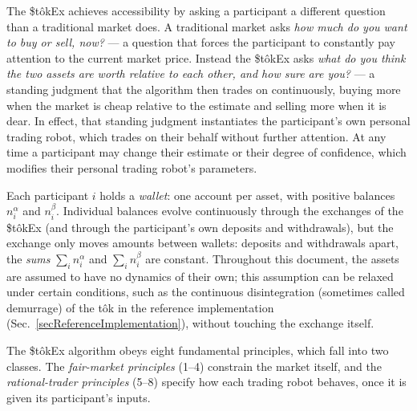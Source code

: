 \documentclass[letterpaper]{article}
\newcommand{\StokEx}{\$t\^{o}kEx}
\begin{document}
The \StokEx{} achieves accessibility by asking a participant a different question
than a traditional market does. A traditional market asks \emph{how much do you want to buy or sell, now?}
--- a question that forces the participant to constantly pay attention to the current market price.
Instead the \StokEx{} asks
\emph{what do you think the two assets are worth relative to each other, and how sure are you?}
--- a standing judgment that the algorithm then trades on continuously,
buying more when the market is cheap relative to the estimate and selling more when it is dear.
In effect, that standing judgment instantiates the participant's own personal trading robot,
which trades on their behalf without further attention.
At any time a participant may change their estimate or their degree of confidence,
which modifies their personal trading robot's parameters.

Each participant $i$ holds a \emph{wallet}: one account per asset, with positive balances $n^\alpha_i$ and $n^\beta_i$.
Individual balances evolve continuously through the exchanges of the \StokEx{}
(and through the participant's own deposits and withdrawals),
but the exchange only moves amounts between wallets:
deposits and withdrawals apart, the \emph{sums} $\sum_i n^\alpha_i$ and $\sum_i n^\beta_i$ are constant.
Throughout this document, the assets are assumed to have no dynamics of their own;
this assumption can be relaxed under certain conditions,
such as the continuous disintegration (sometimes called demurrage) of the t\^{o}k
in the reference implementation (Sec.~\ref{secReferenceImplementation}), without touching the exchange itself.

The \StokEx{} algorithm obeys eight fundamental principles, which fall into two classes.
The \emph{fair-market principles} (1--4) constrain the market itself,
and the \emph{rational-trader principles} (5--8)
specify how each trading robot behaves, once it is given its participant's inputs.
\end{document}
